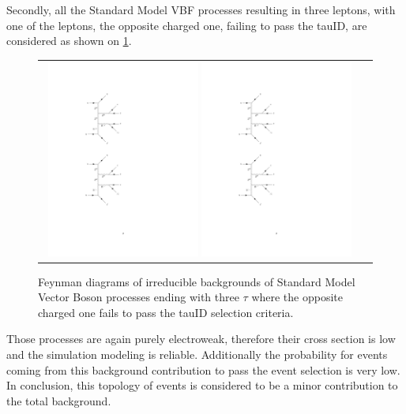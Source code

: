 Secondly, all the Standard Model VBF processes resulting in three leptons, with one of the leptons, the opposite charged one, failing to pass the tauID, are considered as shown on \ref{fig:background_SMVBFZ0Wmiss}.

\begin{figure}[tbh!]
	\centering
	\begin{tabular}{cc}
		\includegraphics[width=0.48\textwidth]{diagrams/pics/background_SMVBFZ0Wmissminus.pdf}
		\includegraphics[width=0.48\textwidth]{diagrams/pics/background_SMVBFZ0Wmissplus.pdf} 		
	\end{tabular}
	\caption{Feynman diagrams of irreducible backgrounds of Standard Model Vector Boson  processes ending with three $\tau$ where the opposite charged one fails to pass the tauID selection criteria. }
	\label{fig:background_SMVBFZ0Wmiss}
\end{figure}

Those processes are again purely electroweak, therefore their cross section is low and the simulation modeling is reliable. Additionally the probability for events coming from this background contribution to pass the event selection is very low. In conclusion, this topology of events is considered to be a minor contribution to the total background.  

